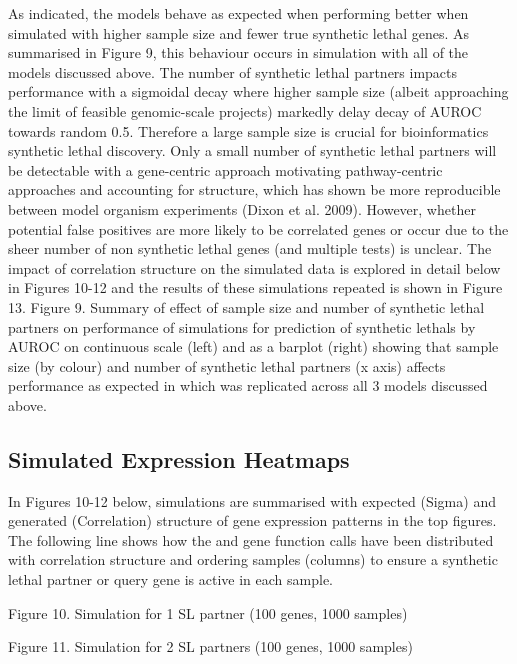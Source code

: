 As indicated, the models behave as expected when performing better when simulated with higher sample size and fewer true \gls{synthetic lethal} genes.  As summarised in Figure 9, this behaviour occurs in simulation with all of the models discussed above.  The number of \gls{synthetic lethal} partners impacts performance with a sigmoidal decay where­­ higher sample size (albeit approaching the limit of feasible \gls{genomic}-scale projects) markedly delay decay of \gls{AUROC} towards random 0.5.  Therefore a large sample size is crucial for \gls{bioinformatics} \gls{synthetic lethal} discovery.  Only a small number of \gls{synthetic lethal} partners will be detectable with a gene-centric approach motivating pathway-centric approaches and accounting for  structure, which has shown be more reproducible between model organism experiments (Dixon et al. 2009).  However, whether potential false positives are more likely to be correlated genes or occur due to the sheer number of non synthetic lethal genes (and multiple tests) is unclear.  The impact of correlation structure on the simulated data is explored in detail below in Figures 10-12 and the results of these simulations repeated is shown in Figure 13.    Figure 9.  Summary of effect of sample size and number of \gls{synthetic lethal} partners on performance of simulations for prediction of \glspl{synthetic lethal} by \gls{AUROC} on continuous scale (left) and as a barplot (right) showing that sample size (by colour) and number of \gls{synthetic lethal} partners (x axis) affects performance as expected in which was replicated across all 3 models discussed above.

\subsection{Simulated Expression Heatmaps}

In Figures 10-12 below, simulations are summarised with expected (Sigma) and generated (Correlation) structure of \gls{gene expression} patterns in the top figures.  The following line shows how the  and gene function calls have been distributed with correlation structure and ordering samples (columns) to ensure a \gls{synthetic lethal} partner or query gene is active in each sample.

Figure 10.  Simulation for 1 SL partner (100 genes, 1000 samples)

Figure 11.  Simulation for 2 SL partners (100 genes, 1000 samples)


